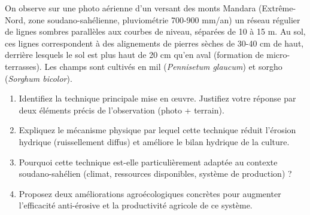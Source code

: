 \documentclass[11pt]{article}
\begin{document}
\begin{exercice}
On observe sur une photo aérienne d'un versant des monts Mandara (Extrême-Nord, zone soudano-sahélienne, pluviométrie 700-900 mm/an) un réseau régulier de lignes sombres parallèles aux courbes de niveau, séparées de 10 à 15 m. Au sol, ces lignes correspondent à des alignements de pierres sèches de 30-40 cm de haut, derrière lesquels le sol est plus haut de 20 cm qu'en aval (formation de micro-terrasses). Les champs sont cultivés en mil (\emph{Pennisetum glaucum}) et sorgho (\emph{Sorghum bicolor}).
\begin{enumerate}
    \item Identifiez la technique principale mise en œuvre. Justifiez votre réponse par deux éléments précis de l'observation (photo + terrain).
    \item Expliquez le mécanisme physique par lequel cette technique réduit l'érosion hydrique (ruissellement diffus) et améliore le bilan hydrique de la culture.
    \item Pourquoi cette technique est-elle particulièrement adaptée au contexte soudano-sahélien (climat, ressources disponibles, système de production) ?
    \item Proposez deux améliorations agroécologiques concrètes pour augmenter l'efficacité anti-érosive et la productivité agricole de ce système.
\end{enumerate}
\end{exercice}
\end{document}
